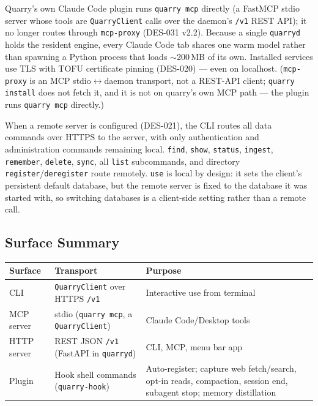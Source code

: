 \documentclass[a4paper,10pt]{article}
\begin{document}
Quarry's own Claude Code plugin runs \texttt{quarry mcp} directly (a
FastMCP stdio server whose tools are \texttt{QuarryClient} calls over the
daemon's \texttt{/v1} REST API); it no longer routes through
\texttt{mcp-proxy} (DES-031 v2.2).  Because a single \texttt{quarryd}
holds the resident engine, every Claude Code tab shares one warm model
rather than spawning a Python process that loads $\sim$200\,MB of its
own.  Installed services use TLS with TOFU certificate pinning (DES-020)
--- even on localhost.  (\texttt{mcp-proxy} is an MCP stdio$\leftrightarrow$daemon
transport, not a REST-API client; \texttt{quarry install} does not fetch it,
and it is not on quarry's own MCP path --- the plugin runs \texttt{quarry mcp}
directly.)

When a remote server is configured (DES-021), the CLI routes
all data commands over HTTPS to the server, with only authentication
and administration commands remaining local.  \texttt{find},
\texttt{show}, \texttt{status}, \texttt{ingest}, \texttt{remember},
\texttt{delete}, \texttt{sync}, all \texttt{list} subcommands, and
directory \texttt{register}/\texttt{deregister} route remotely.
\texttt{use} is local by design: it sets the client's persistent default
database, but the remote server is fixed to the database it was started
with, so switching databases is a client-side setting rather than a
remote call.

\subsection{Surface Summary}

\begin{center}
\begin{tabular}{llp{7cm}}
\toprule
\textbf{Surface} & \textbf{Transport} & \textbf{Purpose} \\
\midrule
CLI         & \texttt{QuarryClient} over HTTPS \texttt{/v1} & Interactive use from terminal \\
MCP server  & stdio (\texttt{quarry mcp}, a \texttt{QuarryClient}) & Claude Code/Desktop tools \\
HTTP server & REST JSON \texttt{/v1} (FastAPI in \texttt{quarryd}) & CLI, MCP, menu bar app \\
Plugin      & Hook shell commands (\texttt{quarry-hook}) & Auto-register; capture web fetch/search,
              opt-in reads, compaction, session end, subagent stop; memory distillation \\
\bottomrule
\end{tabular}
\end{center}
\end{document}
